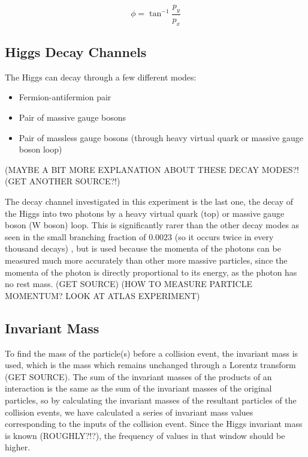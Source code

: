 \documentclass[11pt]{amsart}
\begin{document}
\begin{multicols}{2}
\begin{equation}
  \label{eq:azimuthal}
  \phi = \tan^{-1} \frac{p_y}{p_x}
\end{equation}

\subsection{Higgs Decay Channels}

The Higgs can decay through a few different modes:

\begin{itemize}
    \item Fermion-antifermion pair
    \item Pair of massive gauge bosons
    \item Pair of massless gauge bosons (through heavy virtual quark or massive gauge boson loop)
\end{itemize}

\cite{decaymodes1}

(MAYBE A BIT MORE EXPLANATION ABOUT THESE DECAY MODES?! (GET ANOTHER SOURCE?!)

The decay channel investigated in this experiment is the last one, the decay of the Higgs into two photons by a heavy virtual quark (top) or massive gauge boson (W boson) loop. This is significantly rarer than the other decay modes as seen in the small branching fraction of $0.0023$ (so it occurs twice in every thousand decays) \cite{HiggsCross1}, but is used because the momenta of the photons can be measured much more accurately than other more massive particles, since the momenta of the photon is directly proportional to its energy, as the photon has no rest mass. (GET SOURCE) (HOW TO MEASURE PARTICLE MOMENTUM? LOOK AT ATLAS EXPERIMENT)

\subsection{Invariant Mass}
\label{sec:invariant}

To find the mass of the particle(s) before a collision event, the invariant mass is used, which is the mass which remains unchanged through a Lorentz transform (GET SOURCE). The sum of the invariant masses of the products of an interaction is the same as the sum of the invariant masses of the original particles, so by calculating the invariant masses of the resultant particles of the collision events, we have calculated a series of invariant mass values corresponding to the inputs of the collision event. Since the Higgs invariant mass is known (ROUGHLY?!?), the frequency of values in that window should be higher.


\end{multicols}
\end{document}
